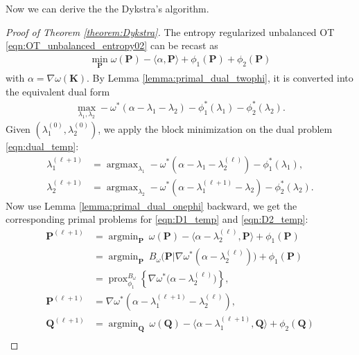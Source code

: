\documentclass[11pt]{book}
\begin{document}
Now we can derive the the Dykstra's algorithm.
\begin{proof}[Proof of Theorem \ref{theorem:Dykstra}]
    The entropy regularized unbalanced OT \eqref{eqn:OT_unbalanced_entropy02} can be recast as
    \begin{align}
        \min_{\mathbf{P}} \omega(\mathbf{P}) - \langle \alpha, \mathbf{P} \rangle + \phi_1(\mathbf{P}) + \phi_2(\mathbf{P}) \tag{P}
    \end{align}
    with $\alpha = \nabla\omega(\mathbf{K})$. By Lemma \ref{lemma:primal_dual_twophi}, it is converted into the equivalent dual form
    \begin{align}\label{eqn:dual_temp}
        \max_{\lambda_1,\lambda_2} - \omega^*(\alpha-\lambda_1-\lambda_2) - \phi_1^*(\lambda_1) - \phi_2^*(\lambda_2). \tag{D}
    \end{align}
    Given $(\lambda_1^{(0)}, \lambda_2^{(0)})$, we apply the block minimization on the dual problem \eqref{eqn:dual_temp}:
    \begin{align}
        \lambda_1^{(\ell+1)} &= \operatorname{argmax}_{\lambda_1} - \omega^*(\alpha-\lambda_1-\lambda_2^{(\ell)}) - \phi_1^*(\lambda_1), \tag{D1} \label{eqn:D1_temp}\\
        \lambda_2^{(\ell+1)} &= \operatorname{argmax}_{\lambda_2} - \omega^*(\alpha-\lambda_1^{(\ell+1)}-\lambda_2) - \phi_2^*(\lambda_2). \tag{D2} \label{eqn:D2_temp}
    \end{align}
    Now use Lemma \ref{lemma:primal_dual_onephi} backward, we get the corresponding primal problems for \eqref{eqn:D1_temp} and \eqref{eqn:D2_temp}:
    \begin{align}
        \mathbf{P}^{(\ell+1)} &= \operatorname{argmin}_{\mathbf{P}}\ \omega(\mathbf{P}) - \langle \alpha - \lambda_2^{(\ell)}, \mathbf{P} \rangle + \phi_1(\mathbf{P}) \nonumber\\
        &= \operatorname{argmin}_{\mathbf{P}}\ B_{\omega}\Big(\mathbf{P}|\nabla\omega^*(\alpha-\lambda_2^{(\ell)})\Big) + \phi_1(\mathbf{P}) \nonumber\\
        &= \operatorname{prox}_{\phi_1}^{B_{\omega}}\left\{ \nabla\omega^*\Big(\alpha-\lambda_2^{(\ell)}\Big) \right\}, \tag{P1} \label{eqn:primal1}\\
        \mathbf{P}^{(\ell+1)} &= \nabla \omega^*\left(\alpha - \lambda_1^{(\ell+1)} - \lambda_2^{(\ell)}\right), \tag{P1-D1} \\
        \mathbf{Q}^{(\ell+1)} &= \operatorname{argmin}_{\mathbf{Q}}\ \omega(\mathbf{Q}) - \langle \alpha - \lambda_1^{(\ell+1)}, \mathbf{Q} \rangle + \phi_2(\mathbf{Q}) \nonumber\\

\end{align}
\end{proof}
\end{document}
